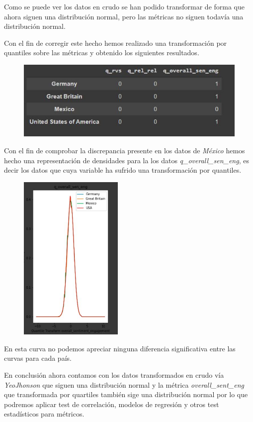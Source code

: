 \documentclass[a4paper,12pt]{article}
\begin{document}
Como se puede ver los datos en crudo se han podido transformar de forma que ahora siguen una distribuci\'on normal, pero las m\'etricas no siguen todav\'ia una distribuci\'on normal.

Con el fin de corregir este hecho hemos realizado una transformaci\'on por quantiles sobre las m\'etricas  y obtenido los siguientes resultados.

\begin{figure}[h!]
\centering
\includegraphics[width=12cm]{dataframe_3.JPG}
\end{figure}

Con el fin de comprobar la discrepancia presente en los datos de {\itshape M\'exico} hemos hecho una representaci\'on de densidades para la los datos {\itshape q\_overall\_sen\_eng}, es decir los datos que cuya variable  ha sufrido una transformaci\'on por quantiles.

\begin{figure}[h!]
\centering
\includegraphics[width=5cm]{grafica_transformada.JPG}
\end{figure}

En esta curva no podemos apreciar ninguna diferencia significativa entre las curvas para cada pa\'is.

En conclusi\'on ahora contamos con los datos transformados en crudo v\'ia {\itshape Yeo\-Jhonson} que siguen una distribuci\'on normal y la m\'etrica {\itshape overall\_sent\_eng} que transformada por quartiles tambi\'en sige una distribuci\'on normal por lo que podremos aplicar test de correlaci\'on, modelos de regresi\'on y otros test estad\'isticos para m\'etricos.
\end{document}

